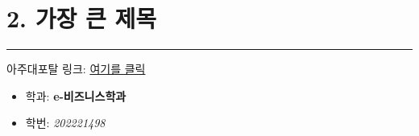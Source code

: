\documentclass[
]{article}
\begin{document}
\hypertarget{uxac00uxc7a5-uxd070-uxc81cuxbaa9-1}{%
\section{2. 가장 큰 제목}\label{uxac00uxc7a5-uxd070-uxc81cuxbaa9-1}}

\begin{center}\rule{0.5\linewidth}{0.5pt}\end{center}

아주대포탈 링크: \href{https://mportal.ajou.ac.kr/main.do}{여기를 클릭}

\begin{itemize}
\item
  학과: \textbf{e-비즈니스학과}
\item
  학번: \emph{202221498}
\end{itemize}
\end{document}
